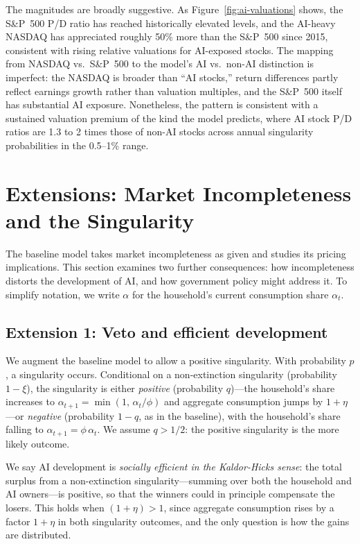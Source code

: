 \documentclass[12pt]{article}
\begin{document}
The magnitudes are broadly suggestive. As Figure~\ref{fig:ai-valuations} shows, the S\&P~500 P/D ratio has reached historically elevated levels, and the AI-heavy NASDAQ has appreciated roughly 50\% more than the S\&P~500 since 2015, consistent with rising relative valuations for AI-exposed stocks. The mapping from NASDAQ vs.\ S\&P~500 to the model's AI vs.\ non-AI distinction is imperfect: the NASDAQ is broader than ``AI stocks,'' return differences partly reflect earnings growth rather than valuation multiples, and the S\&P~500 itself has substantial AI exposure. Nonetheless, the pattern is consistent with a sustained valuation premium of the kind the model predicts, where AI stock P/D ratios are 1.3 to 2 times those of non-AI stocks across annual singularity probabilities in the 0.5--1\% range.

\section{Extensions: Market Incompleteness and the Singularity} \label{sec:extensions} %

The baseline model takes market incompleteness as given and studies its pricing implications. This section examines two further consequences: how incompleteness distorts the development of AI, and how government policy might address it. To simplify notation, we write $\alpha$ for the household's current consumption share $\alpha_t$.

\subsection{Extension 1: Veto and efficient development} %

We augment the baseline model to allow a positive singularity. With probability $p$, a singularity occurs. Conditional on a non-extinction singularity (probability $1 - \xi$), the singularity is either \emph{positive} (probability $q$)---the household's share increases to $\alpha_{t+1} = \min(1,\, \alpha_t / \phi)$ and aggregate consumption jumps by $1 + \eta$---or \emph{negative} (probability $1-q$, as in the baseline), with the household's share falling to $\alpha_{t+1} = \phi \, \alpha_t$. We assume $q > 1/2$: the positive singularity is the more likely outcome.

We say AI development is \emph{socially efficient in the Kaldor-Hicks sense}: the total surplus from a non-extinction singularity---summing over both the household and AI owners---is positive, so that the winners could in principle compensate the losers. This holds when $(1+\eta) > 1$, since aggregate consumption rises by a factor $1+\eta$ in both singularity outcomes, and the only question is how the gains are distributed.
\end{document}
